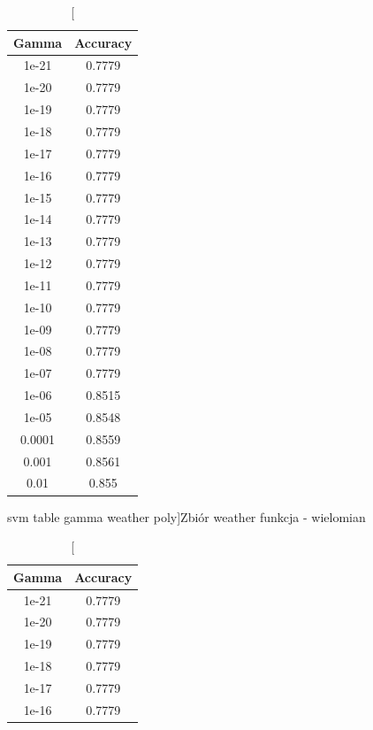 \documentclass{classrep}
\begin{document}
{{\begin{table}[!htbp]
\begin{minipage}{.3\textwidth}
    \end{minipage}
\end{table}
\FloatBarrier
\begin{table}[!htbp]
    \begin{minipage}{.35\textwidth}
        \centering
        \begin{tabular}{|c|c|}
            \hline
			Gamma & Accuracy \\ \hline
1e-21 & 0.7779 \\ \hline
1e-20 & 0.7779 \\ \hline
1e-19 & 0.7779 \\ \hline
1e-18 & 0.7779 \\ \hline
1e-17 & 0.7779 \\ \hline
1e-16 & 0.7779 \\ \hline
1e-15 & 0.7779 \\ \hline
1e-14 & 0.7779 \\ \hline
1e-13 & 0.7779 \\ \hline
1e-12 & 0.7779 \\ \hline
1e-11 & 0.7779 \\ \hline
1e-10 & 0.7779 \\ \hline
1e-09 & 0.7779 \\ \hline
1e-08 & 0.7779 \\ \hline
1e-07 & 0.7779 \\ \hline
1e-06 & 0.8515 \\ \hline
1e-05 & 0.8548 \\ \hline
0.0001 & 0.8559 \\ \hline
0.001 & 0.8561 \\ \hline
0.01 & 0.855 \\ \hline
        \end{tabular}
        \caption
        [svm table gamma weather poly]{Zbiór weather funkcja - wielomian}
		\label{svn_table_gamma_weather_poly}
    \end{minipage}
    \hfill
    \begin{minipage}{.3\textwidth}
        \centering
        \begin{tabular}{|c|c|}
            \hline
			Gamma & Accuracy \\ \hline
1e-21 & 0.7779 \\ \hline
1e-20 & 0.7779 \\ \hline
1e-19 & 0.7779 \\ \hline
1e-18 & 0.7779 \\ \hline
1e-17 & 0.7779 \\ \hline
1e-16 & 0.7779 \\ \hline

\end{tabular}
\end{minipage}
\end{table}}}
\end{document}
